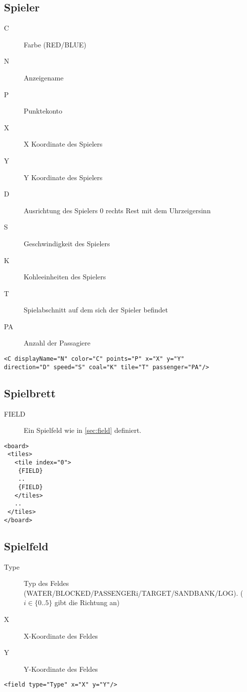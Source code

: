 \documentclass[12pt,a4paper, ngerman, oneside]{scrartcl}
\begin{document}
\subsection{\label{player}Spieler}
\begin{description}
\item[C] Farbe (RED/BLUE)
\item[N] Anzeigename
\item[P] Punktekonto
\item[X] X Koordinate des Spielers
\item[Y] Y Koordinate des Spielers
\item[D] Ausrichtung des Spielers 0 rechts Rest mit dem Uhrzeigersinn
\item[S] Geschwindigkeit des Spielers
\item[K] Kohleeinheiten des Spielers
\item[T] Spielabschnitt auf dem sich der Spieler befindet
\item[PA] Anzahl der Passagiere
\end{description}
\begin{verbatim}
<C displayName="N" color="C" points="P" x="X" y="Y" 
direction="D" speed="S" coal="K" tile="T" passenger="PA"/>
\end{verbatim}


\subsection{\label{board}Spielbrett}
\begin{description}
\item[FIELD] Ein Spielfeld wie in \ref{sec:field} definiert.
\end{description}
\begin{verbatim}
<board>
 <tiles>
   <tile index="0">
 	{FIELD}
 	..
 	{FIELD}
   </tiles>
   ..
 </tiles>
</board>
\end{verbatim}

\subsection{\label{sec:field}Spielfeld}
\begin{description}
\item[Type] Typ des Feldes (WATER/BLOCKED/PASSENGER{i}/TARGET/SANDBANK/LOG). ($i \in \{0..5\}$ gibt die Richtung an)
\item[X] X-Koordinate des Feldes
\item[Y] Y-Koordinate des Feldes
\end{description}
\begin{verbatim}
<field type="Type" x="X" y="Y"/>
\end{verbatim}
\end{document}
